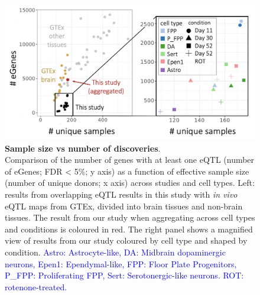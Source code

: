\vspace{2mm}

\begin{figure}[h]
\includegraphics[width=13cm]{Chapter5/Fig/neuroseq_eqtl_gtex_scatterplot.png}
\caption[Sample size vs number of discoveries]{\textbf{Sample size vs number of discoveries}.\\
Comparison of the number of genes with at least one eQTL (number of eGenes; FDR < 5\%; y axis) as a function of effective sample size (number of unique donors; x axis) across studies and cell types. 
Left: results from overlapping eQTL results in this study with \textit{in vivo} eQTL maps from GTEx, divided into brain tissues and non-brain tissues. 
The result from our study when aggregating across cell types and conditions is coloured in red. 
The right panel shows a magnified view of results from our study coloured by cell type and shaped by condition.
\textcolor{blue}{Astro: Astrocyte-like, DA: Midbrain dopaminergic neurons, Epen1: Ependymal-like, FPP: Floor Plate Progenitors, P\_FPP: Proliferating FPP, Sert: Serotonergic-like neurons.
ROT: rotenone-treated.}}
\label{fig:neuroseq_and_gtex_power}
\end{figure}

\newpage

